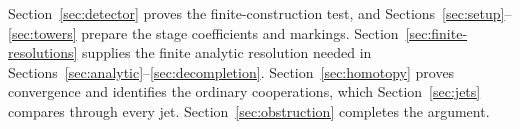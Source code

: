 Section~\ref{sec:detector} proves the finite-construction test, and
Sections~\ref{sec:setup}--\ref{sec:towers} prepare the stage coefficients
and markings. Section~\ref{sec:finite-resolutions} supplies the finite
analytic resolution needed in Sections~\ref{sec:analytic}--\ref{sec:decompletion}.
Section~\ref{sec:homotopy} proves convergence and identifies the ordinary
cooperations, which Section~\ref{sec:jets} compares through every jet.
Section~\ref{sec:obstruction} completes the argument.
\FloatBarrier
